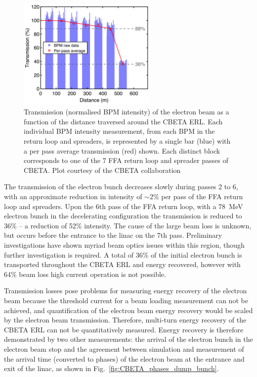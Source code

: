 \documentclass[../main.tex]{subfiles}
\begin{document}
\begin{figure}[!h]
\centering
\includegraphics[width=0.6\textwidth]{Figures/CBETA_Multi-Pass_Commissioning/transmission.pdf}
\caption{Transmission (normalised BPM intensity) of the electron beam as a function of the distance traversed around the CBETA ERL.  Each individual BPM intensity measurement, from each BPM in the return loop and spreaders, is represented by a single bar (blue) with a per pass average transmission (red) shown. Each distinct block corresponds to one of the 7 FFA return loop and spreader passes of CBETA. Plot courtesy of the CBETA collaboration}
\label{fig:CBETA_transmission}
\end{figure}

The transmission of the electron bunch decreases slowly during passes 2 to 6, with an approximate reduction in intensity of $\sim 2$\% per pass of the FFA return loop and spreaders. Upon the 6th pass of the FFA return loop, with a 78~\si{\mega\electronvolt} electron bunch in the decelerating configuration the transmission is reduced to 36\% -- a reduction of 52\% intensity. The cause of the large beam loss is unknown, but occurs before the entrance to the linac on the 7th pass. Preliminary investigations have shown myriad beam optics issues within this region, though further investigation is required. A total of 36\% of the initial electron bunch is transported throughout the CBETA ERL and energy recovered, however with 64\% beam loss high current operation is not possible.

Transmission losses pose problems for measuring energy recovery of the electron beam because the threshold current for a beam loading measurement can not be achieved, and quantification of the electron beam energy recovery would be scaled by the electron beam transmission. Therefore, multi-turn energy recovery of the CBETA ERL can not be quantitatively measured. Energy recovery is therefore demonstrated by two other measurements: the arrival of the electron bunch in the electron beam stop and the agreement between simulation and measurement of the arrival time (converted to phases) of the electron beam at the entrance and exit of the linac, as shown in Fig.~\ref{fig:CBETA_phases_dump_bunch}.    
\end{document}
